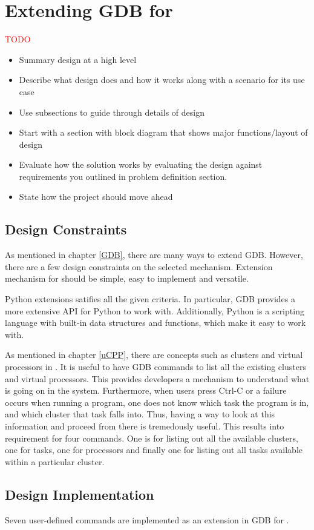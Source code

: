 \chapter{Extending GDB for \uCPP}

\textcolor{red}{TODO}
\begin{itemize}
\item Summary design at a high level
\item Describe what design does and how it works along with a scenario for its
use case
\item Use subsections to guide through details of design
\item Start with a section with block diagram that shows major functions/layout
of design
\item Evaluate how the solution works by evaluating the design against
requirements you outlined in problem definition section.
\item State how the project should move ahead
\end{itemize}

\section{Design Constraints}
As mentioned in chapter \ref{GDB}, there are many ways to extend GDB. However,
there are a few design constraints on the selected mechanism. Extension
mechanism for \uCPPS should be simple, easy to implement and versatile.

Python extensions satifies all the given criteria. In particular, GDB provides a more extensive API for Python to work with. Additionally, Python
is a scripting language with built-in data structures and functions, which make
it easy to work with.

As mentioned in chapter \ref{uCPP}, there are concepts such as clusters and
virtual processors in \uCPP. It is useful to have GDB commands to list
all the existing clusters and virtual processors. This provides developers
a mechanism to understand what is going on in the system. Furthermore, when users
press Ctrl-C or a failure occurs when running a \uCPPS program, one does not
know which task the program is in, and which cluster that task falls into. Thus,
having a way to look at this information and proceed from there is tremedously
useful. This results into requirement for four commands. One is for listing out
all the available clusters, one for tasks, one for processors and finally one
for listing out all tasks available within a particular cluster.

\section{Design Implementation}
Seven user-defined commands are implemented as an extension in GDB for \uCPP.
